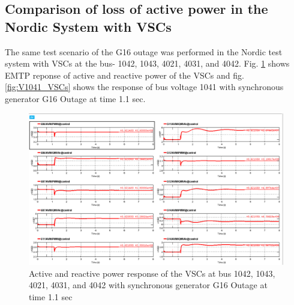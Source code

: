 \documentclass{report}
\begin{document}
\subsection{Comparison of loss of active power in the Nordic System with VSCs}
The same test scenario of the G16 outage was performed in the Nordic test system with VSCs at the bus- 1042, 1043, 4021, 4031, and 4042. Fig. \ref{fig:VSCsS16Outage} shows EMTP reponse of active and reactive power of the VSCs and fig. \ref{fig:V1041_VSCs} shows the response of bus voltage 1041 with synchronous generator G16 Outage at time 1.1 sec.
\begin{figure}
    \centering
    \includegraphics[width=1\linewidth]{Figure_Nordic/S16Outage.png}
    \caption{Active and reactive power response of the VSCs at bus 1042, 1043, 4021, 4031, and 4042 with synchronous generator G16 Outage at time 1.1 sec}
    \label{fig:VSCsS16Outage}
\end{figure}
\end{document}
